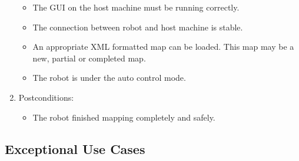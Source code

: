 \documentclass[11pt, a4paper]{report}
\begin{document}
\begin{enumerate}
\begin{itemize}
		\item The GUI on the host machine must be running correctly.
		\item The connection between robot and host machine is stable.
		\item An appropriate XML formatted map can be loaded. This map may be a new, partial or
completed map.
		\item The robot is under the auto control mode.
	\end{itemize}
	\item Postconditions:
	\begin{itemize}
		\item The robot finished mapping completely and safely.
	\end{itemize}
\end{enumerate}

\subsection{Exceptional Use Cases}
\end{document}
